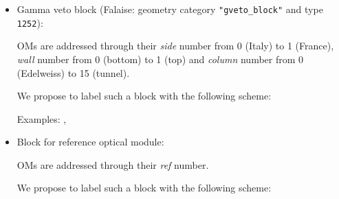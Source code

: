 \documentclass[12pt,a4paper]{article}
\begin{document}
\begin{itemize}
\item Gamma veto block  (Falaise: geometry category \texttt{"gveto\_block"} and
  type   \texttt{1252}):
  
  \par   OMs  are   addressed  through   their
  \emph{side}   number from 0 (Italy)     to  1 (France),
  \emph{wall}   number from 0 (bottom)    to  1 (top)  and
  \emph{column} number from 0 (Edelweiss) to 15 (tunnel).
  
  \par We propose to label  such a block
  with the following scheme:
  \begin{center}
  \end{center}
  \vskip 10pt
  
  \par\noindent Examples: , 
  
\item  Block for  reference  optical module:
  
  \par  OMs are  addressed  through their \emph{ref}  number.
  
  \par We propose to  label such a  block with the following scheme:
  \begin{center}
  \end{center}

\end{itemize}

%
%
\end{document}
